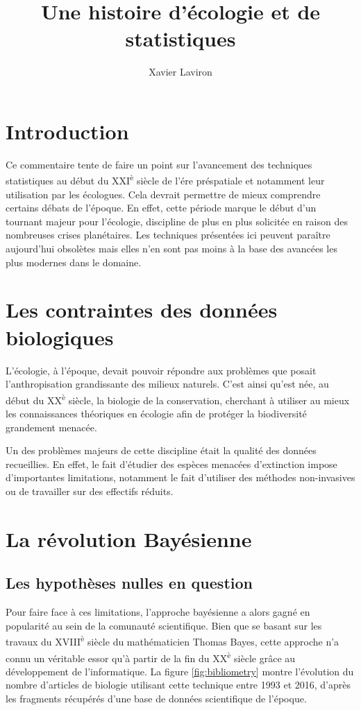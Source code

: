 \documentclass[11pt,twocolumn,twoside]{bopHomework}
\title{Une histoire d'écologie et de statistiques}
\author[1,*]{Xavier Laviron}
\affil[1]{Département des publications (BOP2), Société de publication de
  l'Encyclopedia Galactica, Presses de Terminus}
\affil[*]{Contact : xavier.laviron@gmx.fr}
\begin{document}
\maketitle

\section{Introduction}

Ce commentaire tente de faire un point sur l'avancement des techniques
statistiques au début du XXI\textsuperscript{è} siècle de l'ére préspatiale et
notamment leur utilisation par les écologues.
Cela devrait permettre de mieux comprendre certains débats de l'époque.
En effet, cette période marque le début d'un tournant majeur pour l'écologie,
discipline de plus en plus solicitée en raison des nombreuses crises
planétaires.
Les techniques présentées ici peuvent paraître aujourd'hui obsolètes mais elles
n'en sont pas moins à la base des avancées les plus modernes dans le domaine.


\section{Les contraintes des données biologiques}

L'écologie, à l'époque, devait pouvoir répondre aux problèmes que posait
l'anthropisation grandissante des milieux naturels.
C'est ainsi qu'est née, au début du XX\textsuperscript{è} siècle, la biologie de
la conservation, cherchant à utiliser au mieux les connaissances théoriques en
écologie afin de protéger la biodiversité grandement menacée.

Un des problèmes majeurs de cette discipline était la qualité des données
recueillies.
En effet, le fait d'étudier des espèces menacées d'extinction impose
d'importantes limitations, notamment le fait d'utiliser des méthodes
non-invasives ou de travailler sur des effectifs réduits.


\section{La révolution Bayésienne}
\subsection{Les hypothèses nulles en question}

Pour faire face à ces limitations, l'approche bayésienne a alors gagné en
popularité au sein de la comunauté scientifique.
Bien que se basant sur les travaux du XVIII\textsuperscript{è} siècle du
mathématicien Thomas Bayes, cette approche n'a connu un véritable essor qu'à
partir de la fin du XX\textsuperscript{è} siècle grâce au développement de
l'informatique.
La figure \ref{fig:bibliometry} montre l'évolution du nombre d'articles de
biologie utilisant cette technique entre 1993 et 2016, d'après les fragments
récupérés d'une base de données scientifique de l'époque.
\end{document}
